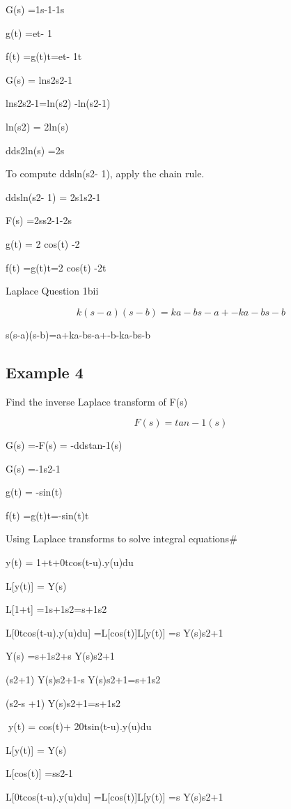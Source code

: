 G(s) =1s-1-1s

g(t) =et- 1

f(t) =g(t)t=et- 1t


 
G(s) = lns2s2-1

 lns2s2-1=ln(s2) -ln(s2-1)

ln(s2) = 2ln(s)


dds2ln(s) =2s


To compute  ddsln(s2- 1), apply the chain rule.


ddsln(s2- 1) = 2s1s2-1 

 F(s) =2ss2-1-2s


 g(t) = 2 cos(t) -2

f(t) =g(t)t=2 cos(t) -2t

\newpage
\Large

Laplace Question 1bii
 
 
\[ k(s-a)(s-b)=ka-bs-a+-ka-bs-b\]
 
 
s(s-a)(s-b)=a+ka-bs-a+-b-ka-bs-b


\newpage
\Large

\subsection*{Example 4 	}
Find the inverse Laplace transform of  F(s)

\[ F(s) =tan-1(s) \]

G(s) =-F(s) = -ddstan-1(s)

G(s) =-1s2-1

g(t) = -sin(t)

f(t) =g(t)t=-sin(t)t
 
 
Using Laplace transforms to solve integral equations#
 
 y(t) = 1+t+0tcos(t-u).y(u)du
 
L[y(t)] = Y(s)
 
L[1+t] =1s+1s2=s+1s2
 
L[0tcos(t-u).y(u)du] =L[cos(t)]L[y(t)] =s Y(s)s2+1
 
Y(s) =s+1s2+s Y(s)s2+1
 
(s2+1) Y(s)s2+1-s Y(s)s2+1=s+1s2
 
(s2-s +1) Y(s)s2+1=s+1s2
 
 

y(t) = cos(t)+ 20tsin(t-u).y(u)du

 
 
L[y(t)] = Y(s)
 
L[cos(t)] =ss2-1
 
L[0tcos(t-u).y(u)du] =L[cos(t)]L[y(t)] =s Y(s)s2+1


